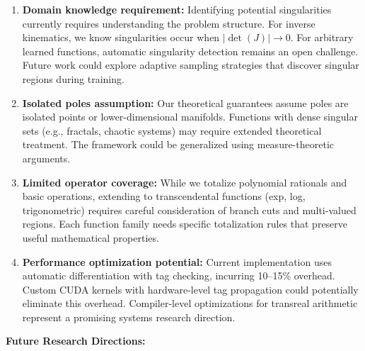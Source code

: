\documentclass[twoside,11pt]{article}
\begin{document}
\begin{enumerate}
\item \textbf{Domain knowledge requirement:} Identifying potential singularities currently requires understanding the problem structure. For inverse kinematics, we know singularities occur when $|\det(J)| \to 0$. For arbitrary learned functions, automatic singularity detection remains an open challenge. Future work could explore adaptive sampling strategies that discover singular regions during training.

\item \textbf{Isolated poles assumption:} Our theoretical guarantees assume poles are isolated points or lower-dimensional manifolds. Functions with dense singular sets (e.g., fractals, chaotic systems) may require extended theoretical treatment. The framework could be generalized using measure-theoretic arguments.

\item \textbf{Limited operator coverage:} While we totalize polynomial rationals and basic operations, extending to transcendental functions (exp, log, trigonometric) requires careful consideration of branch cuts and multi-valued regions. Each function family needs specific totalization rules that preserve useful mathematical properties.

\item \textbf{Performance optimization potential:} Current implementation uses automatic differentiation with tag checking, incurring 10--15\% overhead. Custom CUDA kernels with hardware-level tag propagation could potentially eliminate this overhead. Compiler-level optimizations for transreal arithmetic represent a promising systems research direction.
\end{enumerate}

\textbf{Future Research Directions:}
\end{document}

